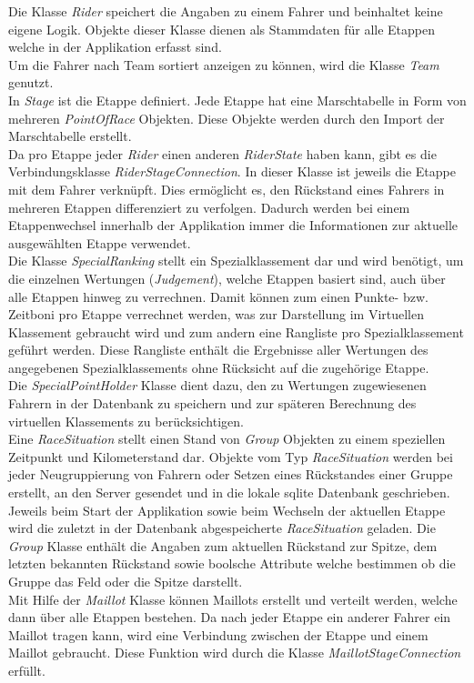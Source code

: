 Die Klasse \textit{Rider} speichert die Angaben zu einem Fahrer und beinhaltet keine eigene Logik. Objekte dieser Klasse dienen als Stammdaten für alle Etappen welche in der Applikation erfasst sind.\\
Um die Fahrer nach Team sortiert anzeigen zu können, wird die Klasse \textit{Team} genutzt.\\
In \textit{Stage} ist die Etappe definiert. Jede Etappe hat eine Marschtabelle in Form von mehreren \textit{PointOfRace} Objekten. Diese Objekte werden durch den Import der Marschtabelle erstellt.\\
Da pro Etappe jeder \textit{Rider} einen anderen \textit{RiderState} haben kann, gibt es die Verbindungsklasse \textit{RiderStageConnection}. In dieser Klasse ist jeweils die Etappe mit dem Fahrer verknüpft. Dies ermöglicht es, den Rückstand eines Fahrers in mehreren Etappen differenziert zu verfolgen. Dadurch werden bei einem Etappenwechsel innerhalb der Applikation immer die Informationen zur aktuelle ausgewählten Etappe verwendet.\\
Die Klasse \textit{SpecialRanking} stellt ein Spezialklassement dar und wird benötigt, um die einzelnen Wertungen (\textit{Judgement}), welche Etappen basiert sind, auch über alle Etappen hinweg zu verrechnen. Damit können zum einen Punkte- bzw. Zeitboni pro Etappe verrechnet werden, was zur Darstellung im Virtuellen Klassement gebraucht wird und zum andern eine Rangliste pro Spezialklassement geführt werden. Diese Rangliste enthält die Ergebnisse aller Wertungen des angegebenen Spezialklassements ohne Rücksicht auf die zugehörige Etappe.\\
Die \textit{SpecialPointHolder} Klasse dient dazu, den zu Wertungen zugewiesenen Fahrern in der Datenbank zu speichern und zur späteren Berechnung des virtuellen Klassements zu berücksichtigen.\\
Eine \textit{RaceSituation} stellt einen Stand von \textit{Group} Objekten zu einem speziellen Zeitpunkt und Kilometerstand dar. Objekte vom Typ \textit{RaceSituation} werden bei jeder Neugruppierung von Fahrern oder Setzen eines Rückstandes einer Gruppe erstellt, an den Server gesendet und in die lokale \gls{sqlite} Datenbank geschrieben. Jeweils beim Start der Applikation sowie beim Wechseln der aktuellen Etappe wird die zuletzt in der Datenbank abgespeicherte \textit{RaceSituation} geladen. Die \textit{Group} Klasse enthält die Angaben zum aktuellen Rückstand zur Spitze, dem letzten bekannten Rückstand sowie boolsche Attribute welche bestimmen ob die Gruppe das Feld oder die Spitze darstellt.\\
Mit Hilfe der \textit{Maillot} Klasse können Maillots erstellt und verteilt werden, welche dann über alle Etappen bestehen. Da nach jeder Etappe ein anderer Fahrer ein Maillot tragen kann, wird eine Verbindung zwischen der Etappe und einem Maillot gebraucht. Diese Funktion wird durch die Klasse \textit{MaillotStageConnection} erfüllt. 


